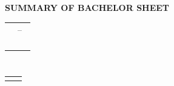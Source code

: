 {{\newpage
	
\begin{center}\MakeUppercase{\Large\bfseries{Summary of BACHELOR sheet\phantom{ř}}}\end{center} 
\vspace{1cm}
\noindent\begin{tabularx}{\textwidth}{| Y | C{4.5cm} | C{4.5cm} |}
	\hline
	\Z {} &  &  \\ \hline
	\Z \parbox[c]{3cm}{\centering{}} &   \\ \hline
	\Z {} &  &  \\ \hline
	\Z {} &   \\ \hline
	\Z {} &  & \sout{} \\ \hline 
	\Z \parbox[c]{3cm}{\centering{}} &   \\ \hline
\end{tabularx}

\vspace{1cm}
\noindent\begin{tabularx}{\textwidth}{|@{}Y@{}|C{2.2cm}||@{}Y@{}|C{1cm}||@{}Y@{}|C{1cm}|}
	\hline
	\Z {} & \fakultaEN &\parbox[c]{3cm}{\centering{}} & \ZkatedraCZ &  \parbox[c]{3cm}{\centering{}} & \Rokodevzdani \\ \hline
\end{tabularx}

\vspace{1cm}

\noindent\begin{tabularx}{\textwidth}{|@{}Y@{}|C{2.2cm}||@{}Y@{}|C{1cm}||@{}Y@{}|C{1cm}|}
	\hline
	\Z {} & \Pcelkem &\parbox[c]{2cm}{\centering{}} & \Ptext &  \parbox[c]{3cm}{\centering{}} & \Pgraphic \\ \hline
\end{tabularx}

\vspace{1cm}
\noindent\begin{tabularx}{\textwidth}{| Y |m{10cm} |}
	\hline
	\Z \parbox[c]{4cm}{\centering{}} & \abstrEN \\ \hline   %
	\Z {} & \klicovaEN \\ \hline
\end{tabularx}
}
	\clearpage
	\tableofcontents		%
	
}
